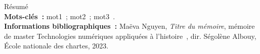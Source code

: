 \medskip	

Résumé\\

\textbf{Mots-clés~:} mot1~; mot2~; mot3~.\\

\textbf{Informations bibliographiques~:} Maëva Nguyen, \textit{Titre du mémoire}, mémoire de master \og Technologies numériques appliquées à l'histoire~\fg, dir. Ségolène Albouy, École nationale des chartes, 2023.

\clearemptydoublepage